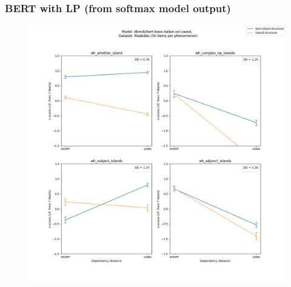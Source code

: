 \subsubsection{BERT with LP (from softmax model output)}
\begin{figure}[h]
	\centering
	\includegraphics[width=1\textwidth]{images/AppendixA/Madeddu_wh_dbmdz_bert-base-italian-xxl-cased_LP-zscores-likert-2022-07-11.png} 
\end{figure}

\clearpage
